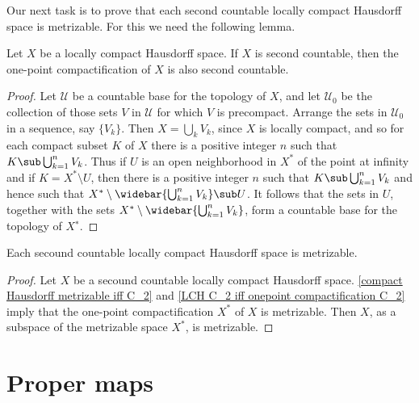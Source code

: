 Our next task is to prove that each second countable locally compact Hausdorff space is metrizable. For this we need the following lemma.
\begin{lemma}\label{LCH C_2 iff onepoint compactification C_2}
Let $X$ be a locally compact Hausdorff space. If $X$ is second countable, then the one-point compactification of $X$ is also second countable.
\end{lemma}
\begin{proof}
Let $\mathcal{U}$ be a countable base for the topology of $X$, and let $\mathcal{U}_0$ be the collection of those sets $V$ in $\mathcal{U}$ for which $V$ is precompact. Arrange the sets in $\mathcal{U}_0$ in a sequence, say $\{V_k\}$. Then $X=\bigcup_kV_k$, since $X$ is locally compact, and so for each compact subset $K$ of $X$ there is a positive integer $n$ such that $K\sub\bigcup_{k=1}^{n}V_k$. Thus if $U$ is an open neighborhood in $X^*$ of the point at infinity and if $K=X^*\setminus U$, then there is a positive integer $n$ such that $K\sub\bigcup_{k=1}^{n}V_k$ and hence such that $X^*\setminus\widebar{\bigcup_{k=1}^{n}V_k}\sub U$. It follows that the sets in $U$, together with the sets $X^*\setminus\widebar{\bigcup_{k=1}^{n}V_k}$, form a countable base for the topology of $X^∗$.
\end{proof}
\begin{proposition}\label{LCH C_2 is metrizable}
Each secound countable locally compact Hausdorff space is metrizable.
\end{proposition}
\begin{proof}
Let $X$ be a secound countable locally compact Hausdorff space. \cref{compact Hausdorff metrizable iff C_2} and \cref{LCH C_2 iff onepoint compactification C_2} imply that the one-point compactification $X^*$ of $X$ is metrizable. Then $X$, as a subspace of the metrizable space $X^*$, is metrizable.
\end{proof}
\section{Proper maps}

